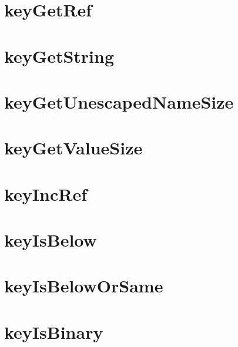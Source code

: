 \let\mypdfximage\pdfximage\def\pdfximage{\immediate\mypdfximage}\documentclass[twoside]{book}
\newcommand{\+}{\discretionary{\mbox{\scriptsize$\hookleftarrow$}}{}{}}
\begin{document}
\chapter{key\+Get\+Ref}
\label{doc_contrib_api_reviews_core_keyGetRef_md}

\chapter{key\+Get\+String}
\label{doc_contrib_api_reviews_core_keyGetString_md}

\chapter{key\+Get\+Unescaped\+Name\+Size}
\label{doc_contrib_api_reviews_core_keyGetUnescapedNameSize_md}

\chapter{key\+Get\+Value\+Size}
\label{doc_contrib_api_reviews_core_keyGetValueSize_md}

\chapter{key\+Inc\+Ref}
\label{doc_contrib_api_reviews_core_keyIncRef_md}

\chapter{key\+Is\+Below}
\label{doc_contrib_api_reviews_core_keyIsBelow_md}

\chapter{key\+Is\+Below\+Or\+Same}
\label{doc_contrib_api_reviews_core_keyIsBelowOrSame_md}

\chapter{key\+Is\+Binary}
\label{doc_contrib_api_reviews_core_keyIsBinary_md}

\end{document}
